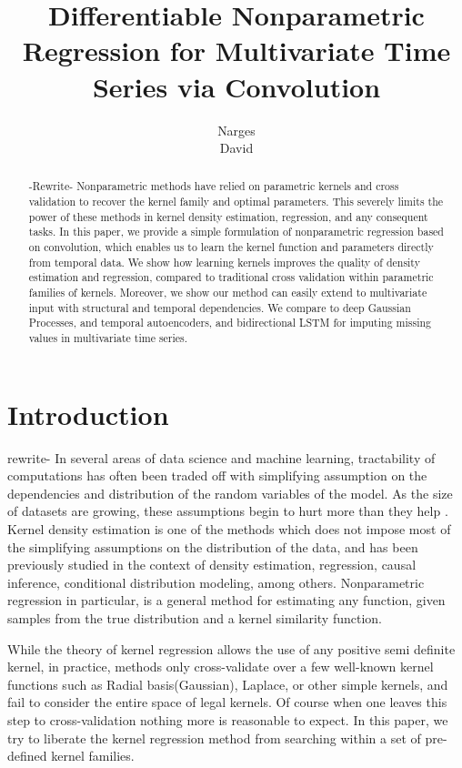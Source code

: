 \documentclass{article} %
\title{Differentiable Nonparametric Regression for Multivariate Time Series via Convolution}
\author{
Narges \\
\AND
David
}
\begin{document}
\maketitle
\begin{abstract}
-Rewrite- Nonparametric methods have relied on parametric kernels and cross validation to recover the kernel family and optimal parameters. This severely limits the power of these methods in kernel density estimation, regression, and any consequent tasks. In this paper, we provide a simple formulation of nonparametric regression based on convolution, which enables us to learn the kernel function and parameters directly from temporal data. We show how learning kernels improves the quality of density estimation and regression, compared to traditional cross validation within parametric families of kernels. Moreover, we show our method can easily extend to multivariate input with structural and temporal dependencies. We compare to deep Gaussian Processes, and temporal autoencoders, and bidirectional LSTM for imputing missing values in multivariate time series.
\end{abstract}

\section{Introduction}

rewrite- In several areas of data science and machine learning, tractability of computations has often been traded off with simplifying assumption on the dependencies and distribution of the random variables of the model.\cite{} \cite{} \cite{} \cite{} As the size of datasets are growing, these assumptions begin to hurt more than they help \cite{} \cite{} \cite{}. Kernel density estimation\cite{} is one of the methods which does not impose most of the simplifying assumptions on the distribution of the data\cite{}, and has been previously studied in the context of density estimation, regression, causal inference, conditional distribution modeling, among others. Nonparametric regression\cite{} in particular, is a general method for estimating any function, given samples from the true distribution and a kernel similarity function.

While the theory of kernel regression allows the use of any positive semi definite kernel, in practice, methods only cross-validate over a few well-known kernel functions such as Radial basis(Gaussian), Laplace, or other simple kernels, and fail to consider the entire space of legal kernels. Of course when one leaves this step to cross-validation nothing more is reasonable to expect. In this paper, we try to liberate the kernel regression method from searching within a set of pre-defined kernel families.
\end{document}
